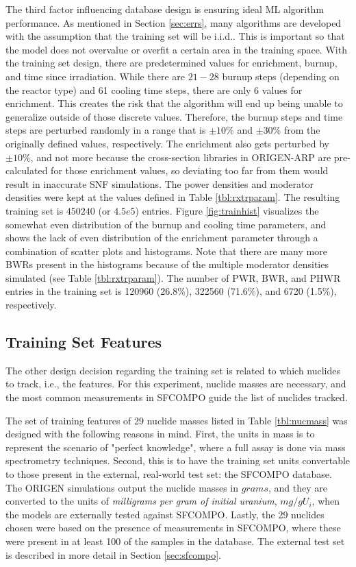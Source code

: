The third factor influencing database design is ensuring ideal \gls{ML}
algorithm performance.  As mentioned in Section \ref{sec:errs}, many algorithms
are developed with the assumption that the training set will be
\acrfull{i.i.d.}.  This is important so that the model does not overvalue or
overfit a certain area in the training space. With the training set design,
there are predetermined values for enrichment, burnup, and time since
irradiation.  While there are $21-28$ burnup steps (depending on the reactor
type) and 61 cooling time steps, there are only 6 values for enrichment. This
creates the risk that the algorithm will end up being unable to generalize
outside of those discrete values. Therefore, the burnup steps and time steps
are perturbed randomly in a range that is $\pm10\%$ and $\pm30\%$ from the
originally defined values, respectively.  The enrichment also gets perturbed by
$\pm10\%$, and not more because the cross-section libraries in \gls{ORIGEN-ARP}
are pre-calculated for those enrichment values, so deviating too far from them
would result in inaccurate \gls{SNF} simulations. The power densities and
moderator densities were kept at the values defined in Table
\ref{tbl:rxtrparam}.  The resulting training set is $450240$ (or $4.5e5$)
entries.  Figure \ref{fig:trainhist} visualizes the somewhat even distribution
of the burnup and cooling time parameters, and shows the lack of even
distribution of the enrichment parameter through a combination of scatter plots
and histograms.  Note that there are many more \gls{BWR}s present in the
histograms because of the multiple moderator densities simulated (see Table
\ref{tbl:rxtrparam}). The number of \gls{PWR}, \gls{BWR}, and \gls{PHWR}
entries in the training set is 120960 (26.8\%), 322560 (71.6\%), and 6720
(1.5\%), respectively.

\subsection{Training Set Features}
\label{sec:snffeats}

The other design decision regarding the training set is related to
which nuclides to track, i.e., the features.  For this experiment, nuclide
masses are necessary, and the most common measurements in \gls{SFCOMPO} guide
the list of nuclides tracked.  

The set of training features of 29 nuclide masses listed in Table
\ref{tbl:nucmass} was designed with the following reasons in mind.  First, the
units in mass is to represent the scenario of "perfect knowledge", where a full
assay is done via mass spectrometry techniques.  Second, this is to have the
training set units convertable to those present in the external, real-world
test set: the \gls{SFCOMPO} database.  The \gls{ORIGEN} simulations output the
nuclide masses in $grams$, and they are converted to the units of
\textit{milligrams per gram of initial uranium}, $mg/gU_i$, when the models are
externally tested against \gls{SFCOMPO}. Lastly, the 29 nuclides chosen were
based on the presence of measurements in \gls{SFCOMPO}, where these were
present in at least 100 of the samples in the database.  The external test set
is described in more detail in Section \ref{sec:sfcompo}.

